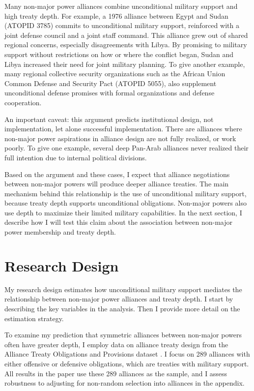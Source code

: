 \documentclass[12pt]{article}
\begin{document}
Many non-major power alliances combine unconditional military support and high treaty depth. 
For example, a 1976 alliance between Egypt and Sudan (ATOPID 3785) commits to unconditional military support, reinforced with a joint defense council and a joint staff command. 
This alliance grew out of shared regional concerns, especially disagreements with Libya. 
By promising to military support without restrictions on how or where the conflict began, Sudan and Libya increased their need for joint military planning. 
To give another example, many regional collective security organizations such as the African Union Common Defense and Security Pact (ATOPID 5055), also supplement unconditional defense promises with formal organizations and defense cooperation.  


An important caveat: this argument predicts institutional design, not implementation, let alone successful implementation. 
There are alliances where non-major power aspirations in alliance design are not fully realized, or work poorly. 
To give one example, several deep Pan-Arab alliances never realized their full intention due to internal political divisions.  


Based on the argument and these cases, I expect that alliance negotiations between non-major powers will produce deeper alliance treaties. 
The main mechanism behind this relationship is the use of unconditional military support, because treaty depth supports unconditional obligations. 
Non-major powers also use depth to maximize their limited military capabilities. 
In the next section, I describe how I will test this claim about the association between non-major power membership and treaty depth. 




\section{Research Design}

My research design estimates how unconditional military support mediates the relationship between non-major power alliances and treaty depth. 
I start by describing the key variables in the analysis. 
Then I provide more detail on the estimation strategy. 


To examine my prediction that symmetric alliances between non-major powers often have greater depth, I employ data on alliance treaty design from the Alliance Treaty Obligations and Provisions dataset \citep{Leedsetal2002}. 
I focus on 289 alliances with either offensive or defensive obligations, which are treaties with military support. 
All results in the paper use these 289 alliances as the sample, and I assess robustness to adjusting for non-random selection into alliances in the appendix. 
\end{document}
